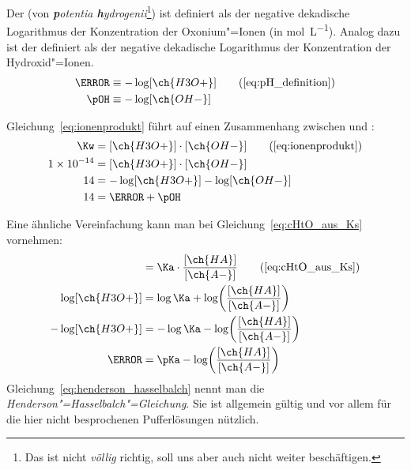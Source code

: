 \documentclass{arbeitsblatt}
\begin{document}
\begin{definition}
  Der \pH{} (von \textit{\textbf{p}otentia \textbf{h}ydrogenii}\footnote{Das ist
    nicht \emph{völlig} richtig, soll uns aber auch nicht weiter
    beschäftigen.}) ist definiert als der negative dekadische Logarithmus der
  Konzentration der Oxonium"=Ionen (in \si{\mole\per\liter}).  Analog dazu ist
  der \pOH{} definiert als der negative dekadische Logarithmus der
  Konzentration der Hydroxid"=Ionen.
  \begin{align}
    \pH  &\equiv -\log[\ch{H3O+}] \tag{\ref{eq:pH_definition}} \\
    \pOH &\equiv -\log[\ch{OH-}]
  \end{align}
\end{definition}

Gleichung~\eqref{eq:ionenprodukt} führt auf einen Zusammenhang zwischen \pH
und \pOH:
\begin{align}
  \Kw         &= [\ch{H3O+}] \cdot [\ch{OH-}] \tag{\ref{eq:ionenprodukt}} \\
  \num{1e-14} &= [\ch{H3O+}] \cdot [\ch{OH-}] \\
  14          &= -\log[\ch{H3O+}] -\log[\ch{OH-}] \\
  14          &= \pH + \pOH \label{eq:ionensumme}
\end{align}

Eine ähnliche Vereinfachung kann man bei Gleichung~\eqref{eq:cHtO_aus_Ks}
vornehmen:
\begin{align}
  [\ch{H3O+}]      &=
    \Ka \cdot \frac{ [\ch{HA}] }{ [\ch{A-}] } \tag{\ref{eq:cHtO_aus_Ks}} \\
  \log[\ch{H3O+}]  &=
    \log\Ka + \log\biggl(\frac{ [\ch{HA}] }{ [\ch{A-}] }\biggr) \\
  -\log[\ch{H3O+}] &=
    -\log\Ka - \log\biggl(\frac{ [\ch{HA}] }{ [\ch{A-}] }\biggr) \\
  \pH             &=
    \pKa - \log\biggl(\frac{ [\ch{HA}] }{ [\ch{A-}] }\biggr)
    \label{eq:henderson_hasselbalch}
\end{align}
Gleichung~\eqref{eq:henderson_hasselbalch} nennt man die
\emph{Henderson"=Hasselbalch"=Gleichung}.  Sie ist allgemein gültig und vor
allem für die hier nicht besprochenen Pufferlösungen nützlich.
\end{document}
